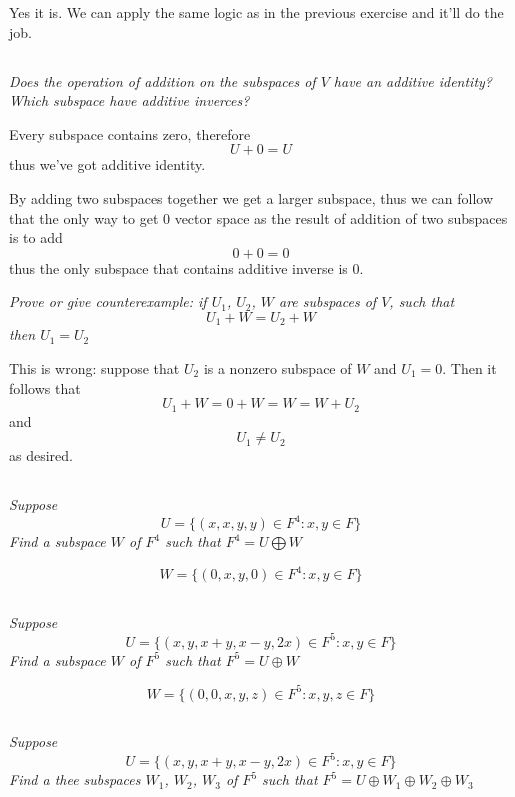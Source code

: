 \documentclass[11pt,oneside,titlepage]{book}
\begin{document}
Yes it is. We can apply the same logic as in the previous exercise and it'll do
the job.

\subsection{}

\textit{Does the operation of addition on the subspaces of $V$ have an additive
  identity? Which subspace have additive inverces?}

Every subspace contains zero, therefore
$$U + 0 = U$$
thus we've got additive identity.

By adding two subspaces together we get a larger subspace, thus we can follow
that the only way to get 0 vector space as the result of addition of two
subspaces is to add
$$0 + 0 = 0$$
thus the only subspace that contains additive inverse is $0$.

\textit{Prove or give counterexample: if $U_1$, $U_2$, $W$ are subspaces of
  $V$, such that }
$$U_1 + W = U_2 + W$$
\textit{then $U_1 = U_2$}

This is wrong: suppose that $U_2$ is a nonzero subspace of $W$ and $U_1 = 0$.
Then it follows that
$$U_1 + W = 0 + W = W = W + U_2$$
and
$$U_1 \neq U_2$$
as desired.

\subsection{}

\textit{Suppose}
$$U = \{(x, x, y, y) \in F^4: x, y \in F\}$$
\textit{Find a subspace $W$ of $F^4$ such that $F^4 = U \bigoplus W$ }

$$W = \{(0, x, y, 0) \in F^4: x, y \in F\}$$


\subsection{}

\textit{Suppose}
$$U = \{(x, y, x + y, x - y, 2x) \in F^5: x, y \in F\}$$
\textit{Find a subspace $W$ of $F^5$ such that $F^5 = U \oplus W$ }

$$W = \{(0, 0, x, y, z) \in F^5: x, y, z \in F\}$$

\subsection{}

\textit{Suppose}
$$U = \{(x, y, x + y, x - y, 2x) \in F^5: x, y \in F\}$$
\textit{Find a thee subspaces $W_1$, $W_2$, $W_3$ of $F^5$
  such that $F^5 = U \oplus W_1 \oplus W_2 \oplus W_3$ }
\end{document}
